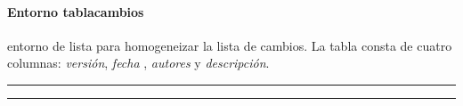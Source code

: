 \documentclass[draft]{ltxdoc}
\begin{document}
	\paragraph{Entorno tablacambios}{entorno de lista para homogeneizar la lista de cambios. La tabla consta de cuatro columnas: \textit{versión}, \textit{fecha} , \textit{autores} y \textit{descripción}.}


	\ifpdf
		\vspace*{\fill}
		\begin{center}
			\color{gray} \hrule
			\hrule
		\end{center}
	\fi
\end{document}
